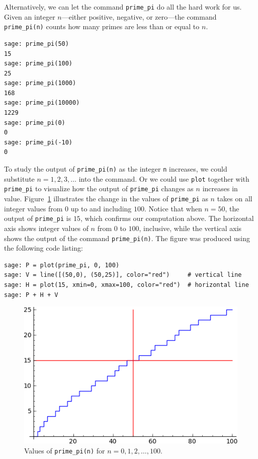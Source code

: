 Alternatively, we can let the command \verb!prime_pi!
do all the hard work for us. Given an integer $n$---either positive,
negative, or zero---the command \verb!prime_pi(n)! counts how many
primes are less than or equal to $n$.
%
\begin{lstlisting}
sage: prime_pi(50)
15
sage: prime_pi(100)
25
sage: prime_pi(1000)
168
sage: prime_pi(10000)
1229
sage: prime_pi(0)
0
sage: prime_pi(-10)
0
\end{lstlisting}
%
To study the output of \verb!prime_pi(n)! as the
integer \verb!n! increases, we could substitute $n = 1, 2, 3, \dots$
into the command. Or we could use \verb!plot! together with
\verb!prime_pi! to visualize how the output of \verb!prime_pi! changes
as $n$ increases in
value. Figure~\ref{fig:number_theory:prime_pi_for_n_leq_100}
illustrates the change in the values of \verb!prime_pi! as $n$ takes
on all integer values from $0$ up to and including $100$. Notice that
when $n = 50$, the output of \verb!prime_pi! is $15$, which confirms
our computation above. The horizontal axis shows integer values of $n$
from $0$ to $100$, inclusive, while the vertical axis shows the output
of the command \verb!prime_pi(n)!. The figure was produced using the
following code listing:
%
\begin{lstlisting}
sage: P = plot(prime_pi, 0, 100)
sage: V = line([(50,0), (50,25)], color="red")     # vertical line
sage: H = plot(15, xmin=0, xmax=100, color="red")  # horizontal line
sage: P + H + V
\end{lstlisting}
%
\begin{figure}[!htbp]
\centering
\includegraphics[scale=0.8]{images/prime-pi-100}
\caption{Values of \texttt{prime\_pi(n)} for $n = 0, 1, 2, \dots, 100$.}
\label{fig:number_theory:prime_pi_for_n_leq_100}
\end{figure}
